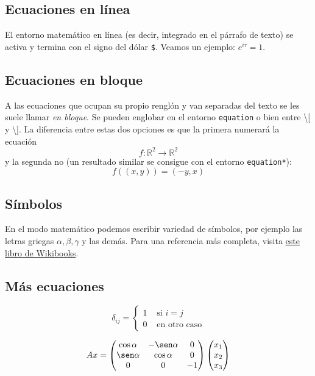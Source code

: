 \documentclass[a4paper]{article}
\begin{document}
\subsection{Ecuaciones en línea}
El entorno matemático en línea (es decir, integrado en el párrafo de
texto) se activa y termina con el signo del dólar \texttt{\$}. Veamos
un ejemplo: $e^{i\tau}=1$.

\subsection{Ecuaciones en bloque}
A las ecuaciones que ocupan su propio renglón y van separadas del
texto se les suele llamar \textit{en bloque}. Se pueden englobar en el
entorno \texttt{equation} o bien entre \textbackslash[ y
\textbackslash]. La diferencia entre estas dos opciones es que la
primera numerará la ecuación
\begin{equation}
  f:\mathbb{R}^2 \rightarrow \mathbb{R}^2
\end{equation}
y la segunda no (un resultado similar se consigue con el entorno
\texttt{equation*}):
\[ f((x, y)) = (-y, x) \]

\subsection{Símbolos}

En el modo matemático podemos escribir variedad de símbolos, por
ejemplo las letras griegas $\alpha, \beta, \gamma$ y las demás. Para
una referencia más completa, visita
\href{https://en.wikibooks.org/wiki/LaTeX/Mathematics#List_of_Mathematical_Symbols}{este libro de Wikibooks}.

\subsection{Más ecuaciones}
\[
  \delta_{ij} =
  \begin{cases}
    1 & \mbox{ si } i = j \\
    0 & \mbox{ en otro caso}
  \end{cases}
\]

\[
  Ax = 
  \begin{pmatrix}
    \cos\alpha & -\sen\alpha & 0  \\
    \sen\alpha & \cos\alpha  & 0  \\
    0          & 0           & -1
  \end{pmatrix}
  \begin{pmatrix}
    x_1 \\
    x_2 \\
    x_3
  \end{pmatrix}
\]
\end{document}
